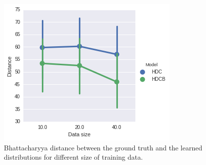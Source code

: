 \begin{figure}[htp]
\centering
\includegraphics[width=\textwidth]{images/bhatta-distance.png}
\caption[Model evaluation : Bhattacharyya distance]{Bhattacharyya distance between the ground truth and the learned distributions for different size of training data. }
\label{}
\end{figure}



